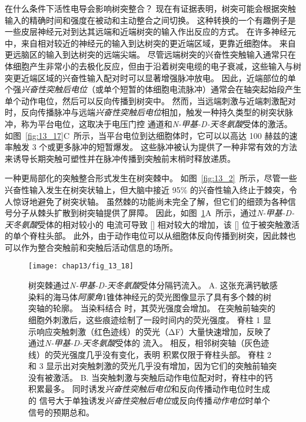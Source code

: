 在什么条件下活性电导会影响树突整合？
现在有证据表明，树突可能会根据突触输入的精确时间和强度在被动和主动整合之间切换。
这种转换的一个有趣例子是一些皮层神经元对到达其远端和近端树突的输入作出反应的方式。
在许多神经元中，来自相对较近的神经元的输入到达树突的更近端区域，更靠近细胞体。
来自更远脑区的输入到达树突的远端尖端。
尽管远端树突的兴奋性突触输入通常只在体细胞产生非常小的去极化反应，但由于沿着树突电缆的电子衰减，这些输入与树突更近端区域的兴奋性输入配对时可以显著增强脉冲放电。
因此，近端部位的单个强\textit{兴奋性突触后电位}（或单个短暂的体细胞电流脉冲）通常会在轴突起始段产生单个动作电位，然后可以反向传播到树突中。
然而，当远端刺激与近端刺激配对时，反向传播脉冲与远端\textit{兴奋性突触后电位}相加，触发一种持久类型的树突状脉冲，称为平台电位，这取决于电压门控  通道和\textit{N-甲基-D-天冬氨酸}受体的激活。
如图~\ref{fig:13_17}C~所示，当平台电位到达细胞体时，它可以以高达 100 赫兹的速率触发 3 个或更多脉冲的短暂爆发。
这些脉冲被认为提供了一种非常有效的方法来诱导长期突触可塑性并在脉冲传播到突触前末梢时释放递质。


一种更局部化的突触整合形式发生在树突棘中。
如图~\ref{fig:13_2}~所示，尽管一些兴奋性输入发生在树突状轴上，但大脑中接近 95\% 的兴奋性输入终止于棘突，令人惊讶地避免了树突状轴。
虽然棘的功能尚未完全了解，但它们的细颈为各种信号分子从棘头扩散到树突轴提供了屏障。
因此，如图~\ref{fig:13_18}A~所示，通过\textit{N-甲基-D-天冬氨酸}受体的相对较小的  电流可导致 [] 相对较大的增加，该 [] 位于被突触激活的单个脊柱头部。
此外，由于动作电位可以从细胞体反向传播到树突，因此棘也可以作为整合突触前和突触后活动信息的场所。


\begin{figure}[htbp]
	\centering
	\texttt{[image: chap13/fig\_13\_18]}
	\caption{树突棘通过\textit{N-甲基-D-天冬氨酸}受体分隔钙流入。
		A. 这张充满钙敏感染料的海马体\textit{阿蒙角}1锥体神经元的荧光图像显示了具有多个棘的树突轴的轮廓。
		当染料结合  时，其荧光强度会增加。
		在突触前轴突的细胞外刺激后，这些痕迹绘制了一段时间内的荧光强度。
		脊柱 1 显示响应突触刺激（红色迹线）的荧光（ΔF）大量快速增加，反映了通过\textit{N-甲基-D-天冬氨酸}受体的  流入。
		相反，相邻树突轴（灰色迹线）的荧光强度几乎没有变化，表明  积累仅限于脊柱头部。
		脊柱 2 和 3 显示出对突触刺激的荧光几乎没有增加，因为它们的突触前轴突没有被激活\cite{lang2004transient}。 
		B. 当突触刺激与突触后动作电位配对时，脊柱中的钙积累最多。
		同时诱发\textit{兴奋性突触后电位}和反向传播动作电位时生成的  信号大于单独诱发\textit{兴奋性突触后电位}或反向传播\textit{动作电位}时单个  信号的预期总和\cite{yuste1995dendritic}。}
	\label{fig:13_18}
\end{figure}


